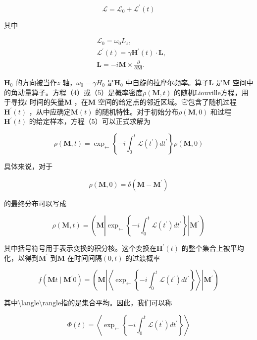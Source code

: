 \documentclass[10pt]{article}
\begin{document}
\[
\mathcal{L}=\mathcal{L}_{0}+\mathcal{L}^{\prime}(t)
\] 

其中

\[
\begin{aligned}
& \mathcal{L}_{0}=\omega_{0} L_{z}, \\
& \mathcal{L}^{\prime}(t)=\gamma \boldsymbol{H}^{\prime}(t) \cdot \boldsymbol{L}, \\
& \boldsymbol{L}=-i \boldsymbol{M} \times \frac{\partial}{\partial \boldsymbol{M}} .
\end{aligned}
\] 

\(\boldsymbol{H}_{0}\) 的方向被当作\(z\) 轴，\(\omega_{0}=\gamma H_{0}\) 是\(\boldsymbol{H}_{0}\) 中自旋的拉摩尔频率。算子\(\boldsymbol{L}\) 是\(\boldsymbol{M}\) 空间中的角动量算子。方程（4）或（5）是概率密度\(\rho(\boldsymbol{M}, t)\) 的随机Liouville方程，用于寻找\(t\) 时间的矢量\(\boldsymbol{M}\) ，在\(\boldsymbol{M}\) 空间的给定点的邻近区域。它包含了随机过程\(\boldsymbol{H}^{\prime}(t)\) ，从中应确定\(\boldsymbol{M}(t)\) 的随机特性。对于初始分布\(\rho(\boldsymbol{M}, 0)\) 和过程\(\boldsymbol{H}^{\prime}(t)\) 的给定样本，方程（5）可以正式求解为

\[
\rho(\boldsymbol{M}, t)=\exp _{\leftarrow}\left\{-i \int_{0}^{t} \mathcal{L}\left(t^{\prime}\right) d t^{\prime}\right\} \rho(\boldsymbol{M}, 0)
\] 

具体来说，对于

\[
\rho(\boldsymbol{M}, 0)=\delta\left(\boldsymbol{M}-\boldsymbol{M}^{\prime}\right)
\] 

的最终分布可以写成

\[
\rho(\boldsymbol{M}, t)=\left(\boldsymbol{M}\left|\exp _{\leftarrow}\left\{-i \int_{0}^{t} \mathcal{L}\left(t^{\prime}\right) d t^{\prime}\right\}\right| \boldsymbol{M}^{\prime}\right)
\] 

其中括号符号用于表示变换的积分核。这个变换在\(\boldsymbol{H}^{\prime}(t)\) 的整个集合上被平均化，以得到\(\boldsymbol{M}^{\prime}\) 到\(\boldsymbol{M}\) 在时间间隔\((0, t)\) 的过渡概率

\[
f\left(\boldsymbol{M} t \mid \boldsymbol{M}^{\prime} 0\right)=\left(\boldsymbol{M}\left|\left\langle\exp _{\leftarrow}\left\{-i \int_{0}^{t} \mathcal{L}\left(t^{\prime}\right) d t^{\prime}\right\}\right\rangle\right| \boldsymbol{M}^{\prime}\right)
\] 

其中\textbackslash  langle\textbackslash  rangle指的是集合平均。因此，我们可以称

\[
\Phi(t)=\left\langle\exp _{\leftarrow}\left\{-i \int_{0}^{t} \mathcal{L}\left(t^{\prime}\right) d t^{\prime}\right\}\right\rangle
\] 
\end{document}
